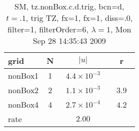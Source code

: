 \begin{table}[hbt]\tableFont %
\begin{center}
\begin{tabular}{|l|c|c|c|} \hline 
grid  & N &  $\vert u \vert$   & r \\ \hline 
             nonBox1 &     1 & ~$4.4\times10^{ -3}$~ &            \\ \hline
             nonBox2 &     2 & ~$1.1\times10^{ -3}$~ & ~$  3.9$~  \\ \hline
             nonBox4 &     4 & ~$2.7\times10^{ -4}$~ & ~$  4.2$~  \\ \hline
    rate             &       &       $2.00$         &        \\ \hline
\end{tabular}
\caption{SM, tz.nonBox.c.d.trig, bcn=d, $t=.1$, trig TZ, fx=1, fx=1, diss=.0, filter=1, filterOrder=6, $\lambda=1$, Mon Sep 28 14:35:43 2009}\label{table:tz.nonBox.c.d.trig}
\end{center}
\end{table}
